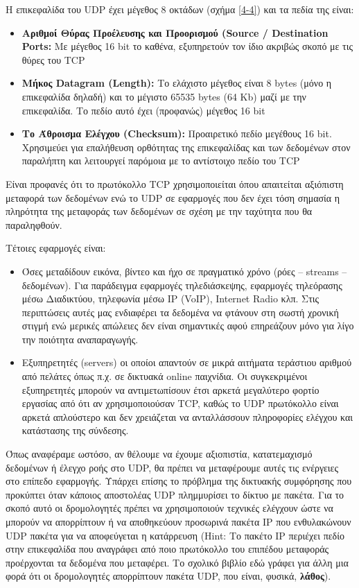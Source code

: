 Η επικεφαλίδα του UDP έχει μέγεθος 8 οκτάδων (σχήμα \ref{4-4}) και τα πεδία της είναι:

\begin{itemize}
\item \textbf{Αριθμοί Θύρας Προέλευσης και Προορισμού (Source / Destination Ports:} Με μέγεθος 16 bit το καθένα, εξυπηρετούν τον ίδιο ακριβώς σκοπό με τις θύρες του TCP
\item \textbf{Μήκος Datagram (Length):} Το ελάχιστο μέγεθος είναι 8 bytes (μόνο η επικεφαλίδα δηλαδή) και το μέγιστο 65535 bytes (64 Kb) μαζί με την επικεφαλίδα. Το πεδίο αυτό έχει (προφανώς) μέγεθος 16 bit
\item \textbf{Το Άθροισμα Ελέγχου (Checksum):} Προαιρετικό πεδίο μεγέθους 16 bit. Χρησιμεύει για επαλήθευση ορθότητας της επικεφαλίδας και των δεδομένων στον παραλήπτη και λειτουργεί παρόμοια με το αντίστοιχο πεδίο του TCP
\end{itemize}

Είναι προφανές ότι το πρωτόκολλο TCP χρησιμοποιείται όπου απαιτείται αξιόπιστη μεταφορά των δεδομένων ενώ το UDP σε εφαρμογές που δεν έχει τόση σημασία η πληρότητα της μεταφοράς των δεδομένων σε σχέση με την ταχύτητα που θα παραληφθούν.

Τέτοιες εφαρμογές είναι:

\begin{itemize}
\item Όσες μεταδίδουν εικόνα, βίντεο και ήχο σε πραγματικό χρόνο (ρόες -- streams -- δεδομένων). Για παράδειγμα εφαρμογές τηλεδιάσκεψης, εφαρμογές τηλεόρασης μέσω Διαδικτύου, τηλεφωνία μέσω IP (VoIP), Internet Radio κλπ. Στις περιπτώσεις αυτές μας ενδιαφέρει τα δεδομένα να φτάνουν στη σωστή χρονική στιγμή ενώ μερικές απώλειες δεν είναι σημαντικές αφού επηρεάζουν μόνο για λίγο την ποιότητα αναπαραγωγής.
\item Εξυπηρετητές (servers) οι οποίοι απαντούν σε μικρά αιτήματα τεράστιου αριθμού από πελάτες όπως π.χ. σε δικτυακά online παιχνίδια. Οι συγκεκριμένοι εξυπηρετητές μπορούν να αντιμετωπίσουν έτσι αρκετά μεγαλύτερο φορτίο εργασίας από ότι αν χρησιμοποιούσαν TCP, καθώς το UDP πρωτόκολλο είναι αρκετά απλούστερο και δεν χρειάζεται να ανταλλάσσουν πληροφορίες ελέγχου και κατάστασης της σύνδεσης. 
\end{itemize}

Όπως αναφέραμε ωστόσο, αν θέλουμε να έχουμε αξιοπιστία, κατατεμαχισμό δεδομένων ή έλεγχο ροής στο UDP, θα πρέπει να μεταφέρουμε αυτές τις ενέργειες στο επίπεδο εφαρμογής. Υπάρχει επίσης το πρόβλημα της δικτυακής συμφόρησης που προκύπτει όταν κάποιος αποστολέας UDP πλημμυρίσει το δίκτυο με πακέτα. Για το σκοπό αυτό οι δρομολογητές πρέπει να χρησιμοποιούν τεχνικές ελέγχουν ώστε να μπορούν να απορρίπτουν ή να αποθηκεύουν προσωρινά πακέτα IP που ενθυλακώνουν UDP πακέτα για να αποφεύγεται η κατάρρευση (Hint: Το πακέτο IP περιέχει πεδίο στην επικεφαλίδα που αναγράφει από ποιο πρωτόκολλο του επιπέδου μεταφοράς προέρχονται τα δεδομένα που μεταφέρει. Το σχολικό βιβλίο εδώ γράφει για άλλη μια φορά ότι οι δρομολογητές απορρίπτουν πακέτα UDP, που είναι, φυσικά, \textbf{λάθος}).